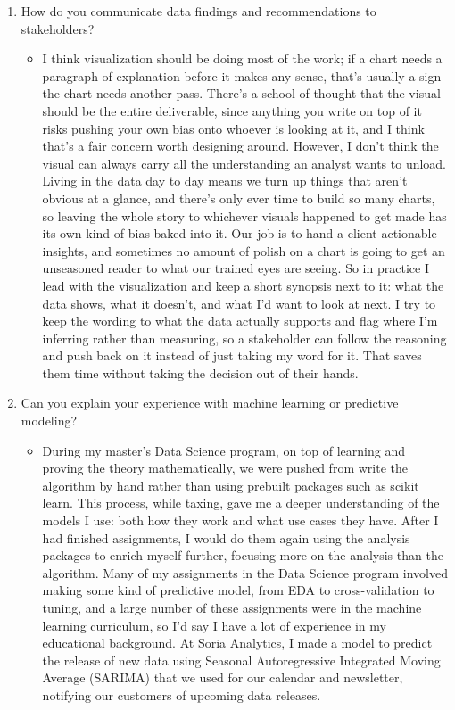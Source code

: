 \documentclass[11pt]{article}
\newcommand{\answer}[1]{%
  \par\vspace{0.35em}%
  \begin{itemize}[label={},leftmargin=1.5em,topsep=0pt,partopsep=0pt,parsep=0pt,itemsep=0pt]
    \item #1
  \end{itemize}%
  \vspace{0.35em}%
}
\begin{document}
\begin{enumerate}[leftmargin=*]
    \item How do you communicate data findings and recommendations to stakeholders?
    \answer{I think visualization should be doing most of the work; if a chart needs a paragraph of
    explanation before it makes any sense, that's usually a sign the chart needs another pass. There's a school of thought
    that the visual should be the entire deliverable, since anything you write on top of it risks pushing your own
    bias onto whoever is looking at it, and I think that's a fair concern worth designing around. However, I don't think
    the visual can always carry all the understanding an analyst wants to unload. Living in the data day to day means we
    turn up things that aren't obvious at a glance, and there's only ever time to build so many charts, so leaving the whole
    story to whichever visuals happened to get made has its own kind of bias baked into it. Our job is to hand a client 
    actionable insights, and sometimes no amount of polish on a chart is going to get an unseasoned reader to what our
    trained eyes are seeing. So in practice I lead with the visualization and keep a short synopsis next to it: what the
    data shows, what it doesn't, and what I'd want to look at next. I try to keep the wording to what the data actually
    supports and flag where I'm inferring rather than measuring, so a stakeholder can follow the reasoning and push back on
    it instead of just taking my word for it. That saves them time without taking the decision out of their hands.}

    \item Can you explain your experience with machine learning or predictive modeling?
    \answer{During my master's Data Science program, on top of learning and proving the theory mathematically, we were pushed from 
    write the algorithm by hand rather than using prebuilt packages such as scikit learn. This process, while taxing, gave me a 
    deeper understanding of the models I use: both how they work and what use cases they have. After I had finished assignments, 
    I would do them again using the analysis packages to enrich myself further, focusing more on the analysis than the algorithm. 
    Many of my assignments in the Data Science program involved making some kind of predictive model, from EDA to 
    cross-validation to tuning, and a large number of these assignments were in the machine learning curriculum, so I'd say
    I have a lot of experience in my educational background. At Soria Analytics, I made a model to predict the release of new 
    data using Seasonal Autoregressive Integrated Moving Average (SARIMA) that we used for our calendar and newsletter, notifying
    our customers of upcoming data releases.}


\end{enumerate}
\end{document}

